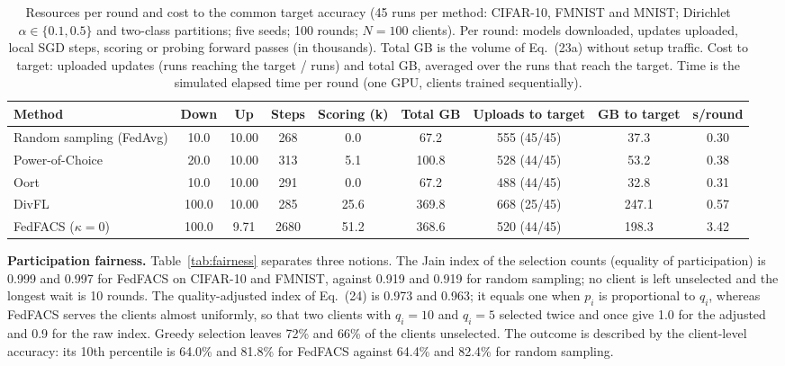 \begin{table}[!htbp]
\centering
\footnotesize
\setlength{\tabcolsep}{2.5pt}
\renewcommand{\arraystretch}{1.08}
\caption{Resources per round and cost to the common target accuracy (45 runs per method: CIFAR-10, FMNIST and MNIST; Dirichlet $\alpha\in\{0.1,0.5\}$ and two-class partitions; five seeds; 100 rounds; $N=100$ clients). Per round: models downloaded, updates uploaded, local SGD steps, scoring or probing forward passes (in thousands). Total GB is the volume of Eq.~(23a) without setup traffic. Cost to target: uploaded updates (runs reaching the target / runs) and total GB, averaged over the runs that reach the target. Time is the simulated elapsed time per round (one GPU, clients trained sequentially).}
\label{tab:cost}
\begin{tabular*}{\journalfloatwidth}{@{\extracolsep{\fill}}lcccccccc@{}}
\toprule
Method & Down & Up & Steps & Scoring (k) & Total GB & Uploads to target & GB to target & s/round \\
\midrule
Random sampling (FedAvg) & 10.0 & 10.00 & 268 & 0.0 & 67.2 & 555 (45/45) & 37.3 & 0.30 \\
Power-of-Choice & 20.0 & 10.00 & 313 & 5.1 & 100.8 & 528 (44/45) & 53.2 & 0.38 \\
Oort & 10.0 & 10.00 & 291 & 0.0 & 67.2 & 488 (44/45) & 32.8 & 0.31 \\
DivFL & 100.0 & 10.00 & 285 & 25.6 & 369.8 & 668 (25/45) & 247.1 & 0.57 \\
FedFACS ($\kappa=0$) & 100.0 & 9.71 & 2680 & 51.2 & 368.6 & 520 (44/45) & 198.3 & 3.42 \\
\bottomrule
\end{tabular*}
\end{table}

\textbf{Participation fairness.} Table~\ref{tab:fairness} separates three notions. The Jain index of the selection counts (equality of participation) is 0.999 and 0.997 for FedFACS on CIFAR-10 and FMNIST, against 0.919 and 0.919 for random sampling; no client is left unselected and the longest wait is 10 rounds. The quality-adjusted index of Eq.~(24) is 0.973 and 0.963; it equals one when $p_i$ is proportional to $q_i$, whereas FedFACS serves the clients almost uniformly, so that two clients with $q_i=10$ and $q_i=5$ selected twice and once give 1.0 for the adjusted and 0.9 for the raw index. Greedy selection leaves 72\% and 66\% of the clients unselected. The outcome is described by the client-level accuracy: its 10th percentile is 64.0\% and 81.8\% for FedFACS against 64.4\% and 82.4\% for random sampling.

